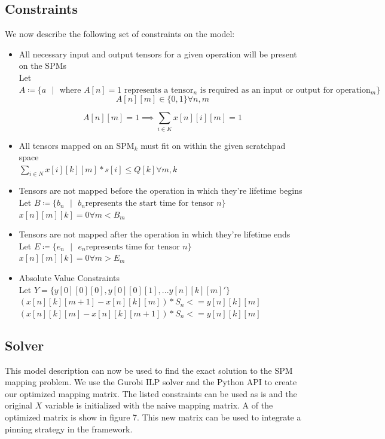 \subsection{Constraints}
We now describe the following set of constraints on the model:
\begin{itemize}
	\item All necessary input and output tensors for a given operation will be present on the SPMs\\

		Let $A \coloneqq \{ a \text{ } | \text{ } \text{where } A[n] = 1\text{ represents a tensor$_n$ is required as an input or output for operation$_m$} \}$\\
		\[
			A[n][m] \in \{0, 1\} \forall n,m
		\]

		\[
			A[n][m] = 1 \implies \sum_{i \in K} x[n][i][m] = 1 
		\]

	\item All tensors mapped on an SPM$_k$ must fit on within the given scratchpad space\\

		$\sum_{i \in N} {x[i][k][m] * s[i]} \leq Q[k] \forall m,k$\\

	\item Tensors are not mapped before the operation in which they're lifetime begins \\

		Let $B \coloneqq \{ b_n \text{ } | \text{ }  b_n \text{represents the start time for tensor $n$}\}$ \\

		$x[n][m][k] = 0 \forall m < B_m$

	\item Tensors are not mapped after the operation in which they're lifetime ends \\

		Let $E \coloneqq \{ e_n \text{ } | \text{ }  e_n \text{represents time for tensor $n$}\}$ \\

		$x[n][m][k]= 0 \forall m > E_m$

	\item Absolute Value Constraints\\
		Let $Y = \{ y[0][0][0], y[0][0][1], ... y[n][k][m]\prime\}$\\
		$(x[n][k][m+1] - x[n][k][m]) * S_n <= y[n][k][m]$\\
		$(x[n][k][m] - x[n][k][m + 1]) * S_n <= y[n][k][m]$\\

\end{itemize}

\subsection{Solver}
This model description can now be used to find the exact solution to the SPM
mapping problem. We use the Gurobi ILP solver and the Python API to create our
optimized mapping matrix. The listed constraints can be used as is and the
original $X$ variable is initialized with the naive mapping matrix.
A %
of the optimized matrix is show in figure 7. This new matrix can be used 
to integrate a pinning strategy in the framework.
